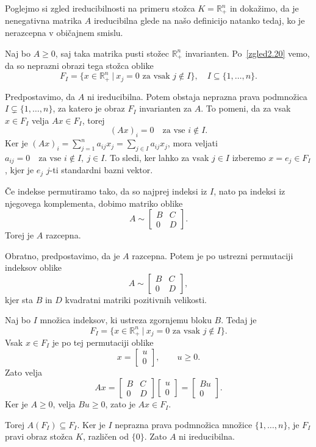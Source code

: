 \documentclass[mat2, tisk]{fmfdelo}
\begin{document}
\begin{zgled}
  Poglejmo si zgled ireducibilnosti na primeru stožca
  $K = \mathbb{R}^n_+$ in dokažimo, da je nenegativna
  matrika $A$ ireducibilna glede na našo definicijo
  natanko tedaj, ko je nerazcepna v običajnem smislu.

  Naj bo $A \geq 0$, saj taka matrika pusti stožec
  $\mathbb{R}^n_+$ invarianten. Po~\ref{zgled2.20}
  vemo, da so neprazni obrazi tega stožca oblike
  \[
  F_I = \{x \in \mathbb{R}^n_+ ~|~
  x_j = 0 \text{ za vsak } j \notin I\},
  \quad I \subseteq \{1, \ldots, n\}.
  \]

  Predpostavimo, da $A$ ni ireducibilna. Potem obstaja
  neprazna prava podmnožica
  $I \subsetneq \{1, \ldots, n\}$, za katero je
  obraz $F_I$ invarianten za $A$.
  To pomeni, da za vsak $x \in F_I$ velja
  $Ax \in F_I$, torej
  \[
  (Ax)_i = 0
  \quad \text{za vse } i \notin I.
  \]
  Ker je
  $(Ax)_i = \sum\limits_{j=1}^n a_{ij}x_j
  = \sum\limits_{j \in I} a_{ij}x_j$,
  mora veljati
  $a_{ij}=0
  \quad \text{za vse } i \notin I,\ j \in I$.
  To sledi, ker lahko za vsak $j \in I$
  izberemo $x=e_j \in F_I$, kjer je $e_j$
  $j$-ti standardni bazni vektor.

  Če indekse permutiramo tako, da so najprej
  indeksi iz $I$, nato pa indeksi iz njegovega
  komplementa, dobimo matriko oblike
  \[
  A \sim
  \begin{bmatrix}
  B & C \\
  0 & D
  \end{bmatrix}.
  \]
  Torej je $A$ razcepna.

  Obratno, predpostavimo, da je $A$ razcepna.
  Potem je po ustrezni permutaciji indeksov
  oblike
  \[
  A \sim
  \begin{bmatrix}
  B & C \\
  0 & D
  \end{bmatrix},
  \]
  kjer sta $B$ in $D$ kvadratni matriki
  pozitivnih velikosti.

  Naj bo $I$ množica indeksov, ki ustreza
  zgornjemu bloku $B$. Tedaj je
  \[
  F_I = \{x \in \mathbb{R}^n_+ ~|~
  x_j=0 \text{ za vsak } j \notin I\}.
  \]
  Vsak $x \in F_I$ je po tej permutaciji
  oblike
  \[
  x =
  \begin{bmatrix}
  u \\
  0
  \end{bmatrix},
  \qquad u \geq 0.
  \]
  Zato velja
  \[
  Ax =
  \begin{bmatrix}
  B & C \\
  0 & D
  \end{bmatrix}
  \begin{bmatrix}
  u \\
  0
  \end{bmatrix}
  =
  \begin{bmatrix}
  Bu \\
  0
  \end{bmatrix}.
  \]
  Ker je $A \geq 0$, velja $Bu \geq 0$,
  zato je $Ax \in F_I$.

  Torej $A(F_I) \subseteq F_I$.
  Ker je $I$ neprazna prava podmnožica
  množice $\{1,\ldots,n\}$, je $F_I$
  pravi obraz stožca $K$, različen od $\{0\}$.
  Zato $A$ ni ireducibilna.
\end{zgled}
\end{document}
